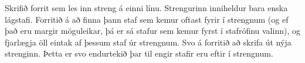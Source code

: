 
Skrifið forrit sem les inn streng á einni línu. Strengurinn inniheldur bara
enska lágstafi. Forritið á að finna þann staf sem kemur oftast fyrir í
strengnum (og ef það eru margir möguleikar, þá er sá stafur sem kemur fyrst í
stafrófinu valinn), og fjarlægja öll eintak af þessum staf úr strengnum. Svo á
forritið að skrifa út nýja strenginn. Þetta er svo endurtekið þar til engir
stafir eru eftir í strengnum.

